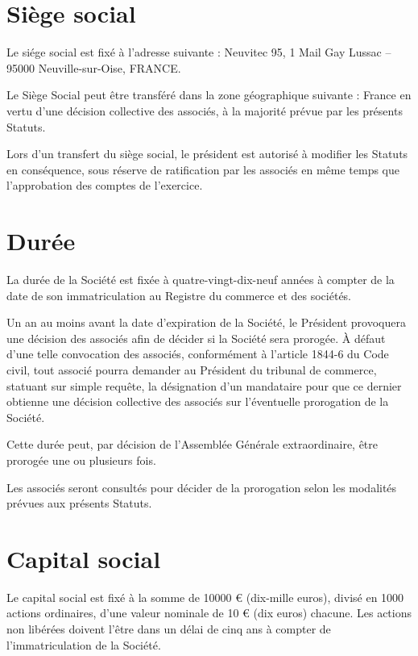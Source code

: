 \documentclass[a4paper,12pt]{report}
\newcommand{\address}{Neuvitec 95, 1 Mail Gay Lussac -- 95000 Neuville-sur-Oise, FRANCE}
\begin{document}
\section{Siège social}
Le siége social est fixé à l'adresse suivante : \address. 

Le Siège Social peut être transféré dans la zone géographique suivante : France en vertu d'une décision collective des associés, à la majorité prévue par les présents Statuts.

Lors d'un transfert du siège social, le président est autorisé à modifier les Statuts en conséquence, sous réserve de ratification par les associés en même temps que l'approbation des comptes de l'exercice.


\section{Durée}
La durée de la Société est fixée à quatre-vingt-dix-neuf années à compter de la date de son immatriculation au Registre du commerce et des sociétés.

Un an au moins avant la date d'expiration de la Société, le Président provoquera une décision des associés afin de décider si la Société sera prorogée. 
À défaut d'une telle convocation des associés, conformément à l'article 1844-6 du Code civil, tout associé pourra demander au Président du tribunal de commerce, 
statuant sur simple requête, la désignation d'un mandataire pour que ce dernier obtienne une décision collective des associés sur l'éventuelle prorogation de la Société.

Cette durée peut, par décision de l'Assemblée Générale extraordinaire, être prorogée une ou plusieurs fois.

Les associés seront consultés pour décider de la prorogation selon les modalités prévues aux présents Statuts.

\section{Capital social}
Le capital social est fixé à la somme de 10000 € (dix-mille euros), divisé en 1000 actions ordinaires,
d'une valeur nominale de 10 € (dix euros) chacune.
Les actions non libérées doivent l'être dans un délai de cinq ans à compter de l'immatriculation de la Société.
\end{document}

